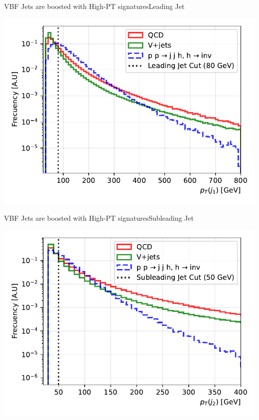 \documentclass{../../bredelebeamer}
\begin{document}
\begin{frame}{VBF Jets are boosted with High-PT signatures}{Leading Jet}
    \begin{minipage}{0.97\textwidth}
        \includegraphics[width=\textwidth]{../Images/leading_jet_pt_comparison.pdf}
    \end{minipage}
\end{frame}
\begin{frame}{VBF Jets are boosted with High-PT signatures}{Subleading Jet}
    \begin{minipage}{0.97\textwidth}
        \includegraphics[width=\textwidth]{../Images/subleading_jet_pt_comparison.pdf}
    \end{minipage}
\end{frame}
\end{document}
